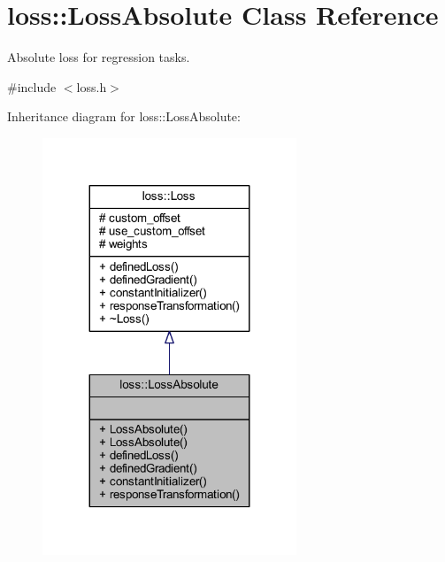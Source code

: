 \hypertarget{classloss_1_1_loss_absolute}{}\section{loss\+:\+:Loss\+Absolute Class Reference}
\label{classloss_1_1_loss_absolute}


Absolute loss for regression tasks.  




{\ttfamily \#include $<$loss.\+h$>$}



Inheritance diagram for loss\+:\+:Loss\+Absolute\+:\nopagebreak
\begin{figure}[H]
\begin{center}
\leavevmode
\includegraphics[width=215pt]{classloss_1_1_loss_absolute__inherit__graph}
\end{center}
\end{figure}


